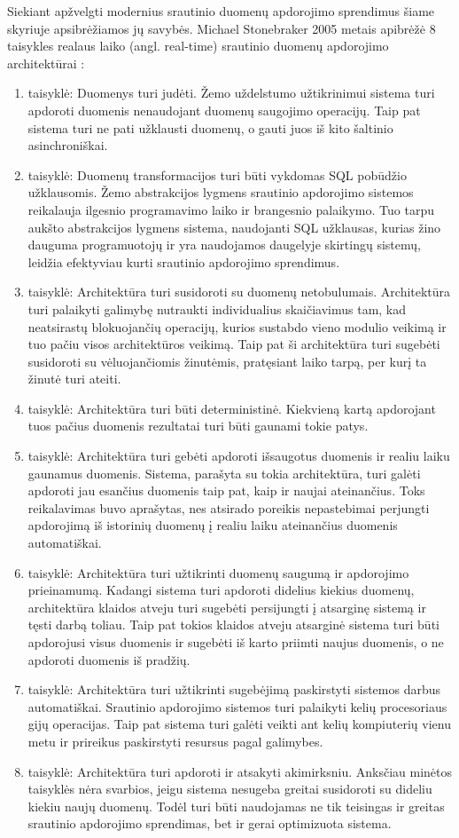 \documentclass{VUMIFPSbakalaurinis}
\begin{document}
Siekiant apžvelgti modernius srautinio duomenų apdorojimo sprendimus šiame skyriuje apsibrėžiamos jų savybės.
Michael Stonebraker 2005 metais apibrėžė 8 taisykles realaus laiko (angl. real-time) srautinio duomenų apdorojimo architektūrai \cite{stonebraker20058}:
\begin{enumerate}[label=\arabic*]
    \item taisyklė: Duomenys turi judėti. Žemo uždelstumo užtikrinimui sistema turi apdoroti duomenis nenaudojant duomenų saugojimo operacijų. 
    Taip pat sistema turi ne pati užklausti duomenų, o gauti juos iš kito šaltinio asinchroniškai. 
    \item taisyklė: Duomenų transformacijos turi būti vykdomas SQL pobūdžio užklausomis. Žemo abstrakcijos lygmens srautinio apdorojimo sistemos reikalauja ilgesnio programavimo laiko ir brangesnio palaikymo. Tuo tarpu aukšto abstrakcijos lygmens sistema, naudojanti SQL užklausas, kurias žino dauguma programuotojų ir yra naudojamos daugelyje skirtingų sistemų, leidžia efektyviau kurti srautinio apdorojimo sprendimus.
    \item taisyklė: Architektūra turi susidoroti su duomenų netobulumais. Architektūra turi palaikyti galimybę nutraukti individualius skaičiavimus tam, kad neatsirastų blokuojančių operacijų, kurios sustabdo vieno modulio veikimą ir tuo pačiu visos architektūros veikimą. Taip pat ši architektūra turi sugebėti susidoroti su vėluojančiomis žinutėmis, pratęsiant laiko tarpą, per kurį ta žinutė turi ateiti.
    \item taisyklė: Architektūra turi būti deterministinė. Kiekvieną kartą apdorojant tuos pačius duomenis rezultatai turi būti gaunami tokie patys.
    \item taisyklė: Architektūra turi gebėti apdoroti išsaugotus duomenis ir realiu laiku gaunamus duomenis. Sistema, parašyta su tokia architektūra, turi galėti apdoroti jau esančius duomenis taip pat, kaip ir naujai ateinančius. Toks reikalavimas buvo aprašytas, nes atsirado poreikis nepastebimai perjungti apdorojimą iš istorinių duomenų į realiu laiku ateinančius duomenis automatiškai.
    \item taisyklė: Architektūra turi užtikrinti duomenų saugumą ir apdorojimo prieinamumą. Kadangi sistema turi apdoroti didelius kiekius duomenų, architektūra klaidos atveju turi sugebėti persijungti į atsarginę sistemą ir tęsti darbą toliau. Taip pat tokios klaidos atveju atsarginė sistema turi būti apdorojusi visus duomenis ir sugebėti iš karto priimti naujus duomenis, o ne apdoroti duomenis iš pradžių.
    \item taisyklė: Architektūra turi užtikrinti sugebėjimą paskirstyti sistemos darbus automatiškai. Srautinio apdorojimo sistemos turi palaikyti kelių procesoriaus gijų operacijas. Taip pat sistema turi galėti veikti ant kelių kompiuterių vienu metu ir prireikus paskirstyti resursus pagal galimybes.
    \item taisyklė: Architektūra turi apdoroti ir atsakyti akimirksniu. Anksčiau minėtos taisyklės nėra svarbios, jeigu sistema nesugeba greitai susidoroti su dideliu kiekiu naujų duomenų. Todėl turi būti naudojamas ne tik teisingas ir greitas srautinio apdorojimo sprendimas, bet ir gerai optimizuota sistema.
\end{enumerate}\par 
\end{document}
